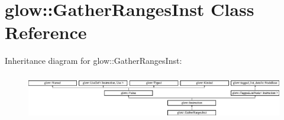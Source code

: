 \hypertarget{classglow_1_1_gather_ranges_inst}{}\section{glow\+:\+:Gather\+Ranges\+Inst Class Reference}
\label{classglow_1_1_gather_ranges_inst}
Inheritance diagram for glow\+:\+:Gather\+Ranges\+Inst\+:\begin{figure}[H]
\begin{center}
\leavevmode
\includegraphics[height=1.991111cm]{classglow_1_1_gather_ranges_inst}
\end{center}
\end{figure}
